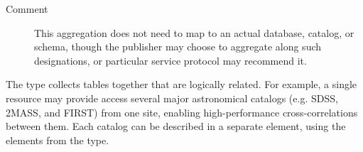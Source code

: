 \documentclass[11pt,a4paper]{ivoa}
\begin{document}
\begin{generated}
\begin{bigdescription}
\begin{description}
\item[Comment] 
                This aggregation does not need to map to an
                actual database, catalog, or schema, though the
                publisher may choose to aggregate along such
                designations, or particular service protocol may
                recommend it.  
              

\end{description}


\end{bigdescription}\endgroup

\endgroup
\end{generated}



The  type collects
tables together that are logically related.  For example, a single
resource may provide access several major astronomical catalogs
(e.g. SDSS, 2MASS, and FIRST) from one site, enabling high-performance
cross-correlations between them.  Each catalog can be described in a
separate  element, using the elements from
the  type. 
\end{document}
